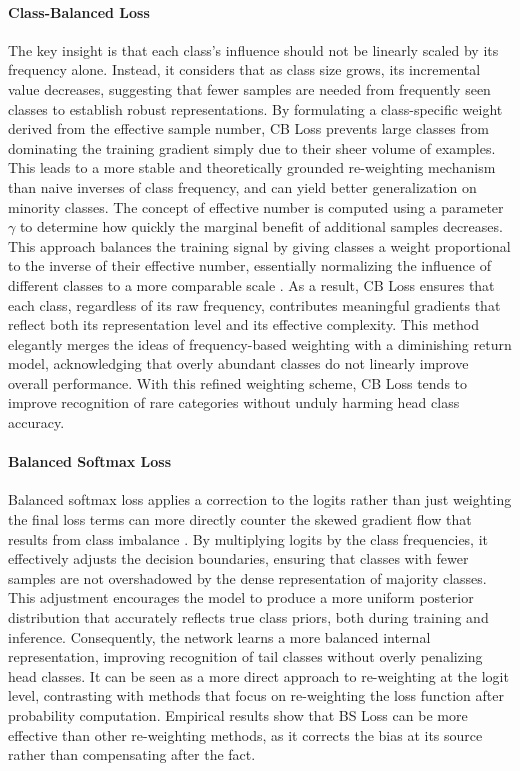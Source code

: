 \paragraph{Class-Balanced Loss}
The key insight is that each class’s influence should not be linearly scaled by its frequency alone. Instead, it considers that as class size grows, its incremental value decreases, suggesting that fewer samples are needed from frequently seen classes to establish robust representations. By formulating a class-specific weight derived from the effective sample number, CB Loss prevents large classes from dominating the training gradient simply due to their sheer volume of examples. This leads to a more stable and theoretically grounded re-weighting mechanism than naive inverses of class frequency, and can yield better generalization on minority classes. The concept of effective number is computed using a parameter $\gamma$ to determine how quickly the marginal benefit of additional samples decreases. This approach balances the training signal by giving classes a weight proportional to the inverse of their effective number, essentially normalizing the influence of different classes to a more comparable scale \cite{zhang2023deep}. As a result, CB Loss ensures that each class, regardless of its raw frequency, contributes meaningful gradients that reflect both its representation level and its effective complexity. This method elegantly merges the ideas of frequency-based weighting with a diminishing return model, acknowledging that overly abundant classes do not linearly improve overall performance. With this refined weighting scheme, CB Loss tends to improve recognition of rare categories without unduly harming head class accuracy. 

\paragraph{Balanced Softmax Loss}
Balanced softmax loss applies a correction to the logits rather than just weighting the final loss terms can more directly counter the skewed gradient flow that results from class imbalance \cite{ren2020balancedmetasoftmaxlongtailedvisual}. By multiplying logits by the class frequencies, it effectively adjusts the decision boundaries, ensuring that classes with fewer samples are not overshadowed by the dense representation of majority classes. This adjustment encourages the model to produce a more uniform posterior distribution that accurately reflects true class priors, both during training and inference. Consequently, the network learns a more balanced internal representation, improving recognition of tail classes without overly penalizing head classes. It can be seen as a more direct approach to re-weighting at the logit level, contrasting with methods that focus on re-weighting the loss function after probability computation. Empirical results show that BS Loss can be more effective than other re-weighting methods, as it corrects the bias at its source rather than compensating after the fact. 

